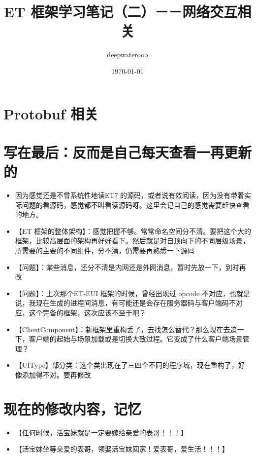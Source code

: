 \documentclass[9pt, b5paper]{article}
\author{deepwaterooo}
\date{\today}
\title{ET 框架学习笔记（二）－－网络交互相关}
\begin{document}
\maketitle
\tableofcontents


\section{Protobuf 相关}
\label{sec:org991a29b}

\section{写在最后：反而是自己每天查看一再更新的}
\label{sec:orgd5bb4d9}
\begin{itemize}
\item 因为感觉还是不曾系统性地读ET7 的源码，或者说有效阅读，因为没有带着实际问题的看源码，感觉都不叫看读源码呀。这里会记自己的感觉需要赶快查看的地方。
\item 【ET 框架的整体架构】：感觉把握不够。常常命名空间分不清。要把这个大的框架，比较高层面的架构再好好看下。然后就是对自顶向下的不同层级场景，所需要的主要的不同组件，分不清，仍需要再熟悉一下源码
\item 【问题】：某些消息，还分不清是内网还是外网消息，暂时先放一下，到时再改
\item 【问题】：上次那个ET-EUI 框架的时候，曾经出现过 opcode 不对应，也就是说，我现在生成的进程间消息，有可能还是会存在服务器码与客户端码不对应，这个完备的框架，这次应该不至于吧？
\item 【ClientComponent】：新框架里重构丢了，去找怎么替代？那么现在去追一下，客户端的起始与场景加载或是切换大致过程。它变成了什么客户端场景管理？
\item 【UIType】部分类：这个类出现在了三四个不同的程序域，现在重构了，好像添加得不对。要再修改
\end{itemize}

\section{现在的修改内容，记忆}
\label{sec:orgd3f69d5}
\begin{itemize}
\item 【任何时候，活宝妹就是一定要嫁给亲爱的表哥！！！】
\item 【活宝妹坐等亲爱的表哥，领娶活宝妹回家！爱表哥，爱生活！！！】
\end{itemize}
\end{document}
